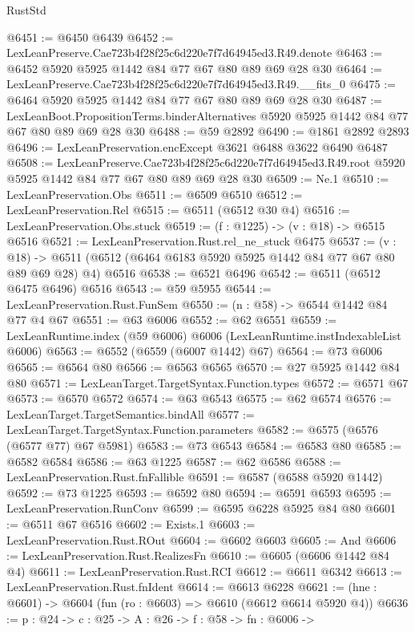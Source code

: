 \begin{lexlean}{RustStd}
\begin{coremodule}
@6451 := @6450 @6439
@6452 := LexLeanPreserve.Cae723b4f28f25c6d220e7f7d64945ed3.R49.denote
@6463 := @6452 @5920 @5925 @1442 @84 @77 @67 @80 @89 @69 @28 @30
@6464 := LexLeanPreserve.Cae723b4f28f25c6d220e7f7d64945ed3.R49.__fits_0
@6475 := @6464 @5920 @5925 @1442 @84 @77 @67 @80 @89 @69 @28 @30
@6487 := LexLeanBoot.PropositionTerms.binderAlternatives
    @5920
    @5925
    @1442
    @84
    @77
    @67
    @80
    @89
    @69
    @28
    @30
@6488 := @59 @2892
@6490 := @1861 @2892 @2893
@6496 := LexLeanPreservation.encExcept @3621 @6488 @3622 @6490 @6487
@6508 := LexLeanPreserve.Cae723b4f28f25c6d220e7f7d64945ed3.R49.root
    @5920
    @5925
    @1442
    @84
    @77
    @67
    @80
    @89
    @69
    @28
    @30
@6509 := Ne.{1}
@6510 := LexLeanPreservation.Obs
@6511 := @6509 @6510
@6512 := LexLeanPreservation.Rel
@6515 := @6511 (@6512 @30 @4)
@6516 := LexLeanPreservation.Obs.stuck
@6519 := (f : @1225) -> (v : @18) -> @6515 @6516
@6521 := LexLeanPreservation.Rust.rel_ne_stuck @6475
@6537 := (v : @18) ->
  @6511 (@6512 (@6464 @6183 @5920 @5925 @1442 @84 @77 @67 @80 @89 @69 @28) @4) @6516
@6538 := @6521 @6496
@6542 := @6511 (@6512 @6475 @6496) @6516
@6543 := @59 @5955
@6544 := LexLeanPreservation.Rust.FunSem
@6550 := (n : @58) -> @6544 @1442 @84 @77 @4 @67
@6551 := @63 @6006
@6552 := @62 @6551
@6559 := LexLeanRuntime.index (@59 @6006) @6006 (LexLeanRuntime.instIndexableList @6006)
@6563 := @6552 (@6559 (@6007 @1442) @67)
@6564 := @73 @6006
@6565 := @6564 @80
@6566 := @6563 @6565
@6570 := @27 @5925 @1442 @84 @80
@6571 := LexLeanTarget.TargetSyntax.Function.types
@6572 := @6571 @67
@6573 := @6570 @6572
@6574 := @63 @6543
@6575 := @62 @6574
@6576 := LexLeanTarget.TargetSemantics.bindAll
@6577 := LexLeanTarget.TargetSyntax.Function.parameters
@6582 := @6575 (@6576 (@6577 @77) @67 @5981)
@6583 := @73 @6543
@6584 := @6583 @80
@6585 := @6582 @6584
@6586 := @63 @1225
@6587 := @62 @6586
@6588 := LexLeanPreservation.Rust.fnFallible
@6591 := @6587 (@6588 @5920 @1442)
@6592 := @73 @1225
@6593 := @6592 @80
@6594 := @6591 @6593
@6595 := LexLeanPreservation.RunConv
@6599 := @6595 @6228 @5925 @84 @80
@6601 := @6511 @67 @6516
@6602 := Exists.{1}
@6603 := LexLeanPreservation.Rust.ROut
@6604 := @6602 @6603
@6605 := And
@6606 := LexLeanPreservation.Rust.RealizesFn
@6610 := @6605 (@6606 @1442 @84 @4)
@6611 := LexLeanPreservation.Rust.RCI
@6612 := @6611 @6342
@6613 := LexLeanPreservation.Rust.fnIdent
@6614 := @6613 @6228
@6621 := (hne : @6601) -> @6604 (fun (ro : @6603) => @6610 (@6612 @6614 @5920 @4))
@6636 := {p : @24} ->
  {c : @25} ->
  {A : @26} ->
  {f : @58} ->
  {fn : @6006} ->

\end{coremodule}
\end{lexlean}
